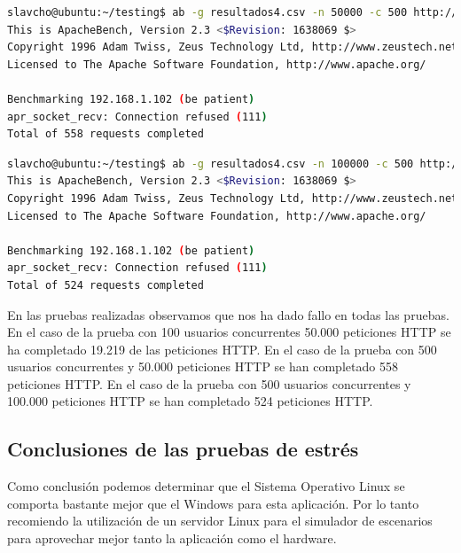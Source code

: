 \begin{lstlisting}[language=bash]
slavcho@ubuntu:~/testing$ ab -g resultados4.csv -n 50000 -c 500 http://192.168.1.102:81/
This is ApacheBench, Version 2.3 <$Revision: 1638069 $>
Copyright 1996 Adam Twiss, Zeus Technology Ltd, http://www.zeustech.net/
Licensed to The Apache Software Foundation, http://www.apache.org/

Benchmarking 192.168.1.102 (be patient)
apr_socket_recv: Connection refused (111)
Total of 558 requests completed
\end{lstlisting}


\begin{lstlisting}[language=bash]
slavcho@ubuntu:~/testing$ ab -g resultados4.csv -n 100000 -c 500 http://192.168.1.102:81/
This is ApacheBench, Version 2.3 <$Revision: 1638069 $>
Copyright 1996 Adam Twiss, Zeus Technology Ltd, http://www.zeustech.net/
Licensed to The Apache Software Foundation, http://www.apache.org/

Benchmarking 192.168.1.102 (be patient)
apr_socket_recv: Connection refused (111)
Total of 524 requests completed
\end{lstlisting}

En las pruebas realizadas observamos que nos ha dado fallo en todas las pruebas. En el caso de la prueba con 100 usuarios concurrentes 50.000 peticiones HTTP se ha completado 19.219 de las peticiones HTTP. En el caso de la prueba con 500 usuarios concurrentes y 50.000 peticiones HTTP se han completado 558 peticiones HTTP. En el caso de la prueba con 500 usuarios concurrentes y 100.000 peticiones HTTP se han completado 524 peticiones HTTP. 

\subsection{Conclusiones de las pruebas de estrés}

Como conclusión podemos determinar que el Sistema Operativo Linux se comporta bastante mejor que el Windows para esta aplicación. Por lo tanto recomiendo la utilización de un servidor Linux para el simulador de escenarios para aprovechar mejor tanto la aplicación como el hardware.